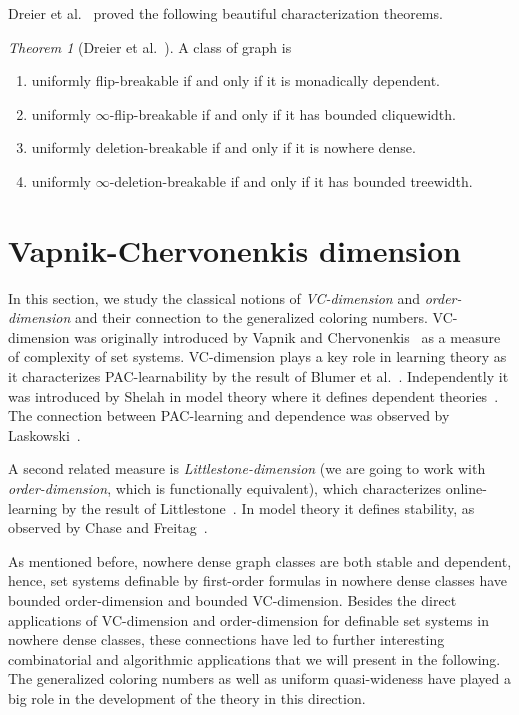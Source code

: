 \documentclass[1p,number,a4paper]{elsarticle}
\theoremstyle{remark}
\newtheorem{theorem}{Theorem}[section]
\begin{document}
Dreier et al.~\cite{dreier2024flip} proved the following beautiful characterization theorems. 

\begin{theorem}[Dreier et al.~\cite{dreier2024flip}]
A class of graph is 
\begin{enumerate}
    \item uniformly flip-breakable if and only if it is monadically dependent. 
    \item uniformly $\infty$-flip-breakable if and only if it has bounded cliquewidth.
    \item uniformly deletion-breakable if and only if it is nowhere dense. 
    \item uniformly $\infty$-deletion-breakable if and only if it has bounded treewidth.
\end{enumerate}
    
\end{theorem}

\section{Vapnik-Chervonenkis dimension}\label{sec:neigh-comp}

In this section, we study the classical notions of \emph{VC-dimension} and \emph{order-dimension} and their connection to the generalized coloring numbers. 
VC-dimension was originally introduced by Vapnik and Chervonenkis~\cite{chervonenkis1971theory} as a measure of complexity of set systems. 
VC-dimension plays a key role in learning theory as it characterizes PAC-learnability by the result of Blumer et al.~\cite{blumer1989learnability}.
Independently it was introduced by Shelah in model theory where it defines dependent theories~\cite{shelah1971stability}. 
The connection between PAC-learning and dependence was observed by Laskowski~\cite{laskowski1992vapnik}.

A second related measure is \emph{Littlestone-dimension} (we are going to work with \emph{order-dimension}, which is functionally equivalent), which characterizes online-learning by the result of Littlestone~\cite{littlestone1988learning}. 
In model theory it defines stability, as observed by Chase and Freitag~\cite{chase2019model}. 

As mentioned before, nowhere dense graph classes are both stable and dependent, hence, set systems definable by first-order formulas in nowhere dense classes have bounded order-dimension and bounded VC-dimension. 
Besides the direct applications of VC-dimension and order-dimension for definable set systems in nowhere dense classes, these connections have led to further interesting combinatorial and algorithmic applications that we will present in the following. 
The generalized coloring numbers as well as uniform quasi-wideness have played a big role in the development of the theory in this direction. 
\end{document}
